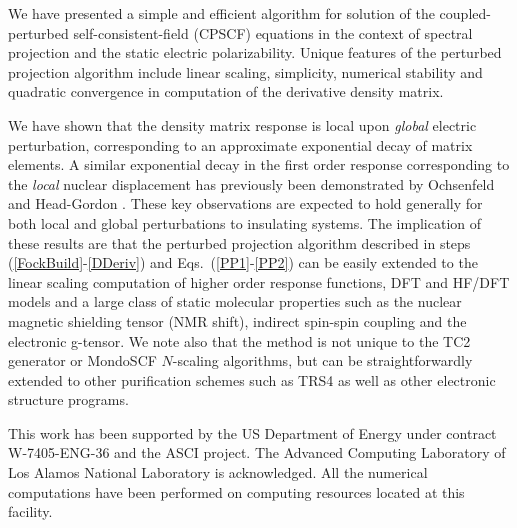 \documentclass[prl,aps,preprint,showpacs,superbib]{revtex4}
\begin{document}
We have presented a simple and efficient algorithm for solution of the coupled-perturbed 
self-consistent-field (CPSCF) equations in the context of spectral projection and the static 
electric polarizability. Unique features of the perturbed projection algorithm include linear 
scaling, simplicity, numerical stability and quadratic convergence in computation of the derivative 
density matrix.  

We have shown that the density matrix response is local upon {\em global} electric perturbation, 
corresponding to an approximate exponential decay of matrix elements. A similar exponential decay 
in the first order response corresponding to the {\em local} nuclear displacement has previously been
demonstrated by Ochsenfeld and Head-Gordon \cite{Ochsenfeld_1997}.   These key observations are expected to
hold generally for both local and global perturbations to insulating systems.  The implication of these 
results are that the perturbed projection algorithm described in steps (\ref{FockBuild}-\ref{DDeriv}) and
Eqs.~(\ref{PP1}-\ref{PP2}) can be easily extended to the linear scaling computation of higher order 
response functions, DFT and HF/DFT models and a large class of static molecular properties such as the 
nuclear magnetic shielding tensor (NMR shift), indirect spin-spin coupling and the electronic g-tensor.
We note also that the method is not unique to the TC2 generator or {\sc MondoSCF} $N$-scaling algorithms, 
but can be straightforwardly extended to other purification schemes such as TRS4 \cite{ANiklasson03} as
well as other electronic structure programs.

This work has been supported by the US Department of Energy 
under contract W-7405-ENG-36 and the ASCI project.  
The Advanced Computing Laboratory of Los 
Alamos National Laboratory is acknowledged.
All the numerical computations have been
performed on computing resources located at this facility.



%
\end{document}
